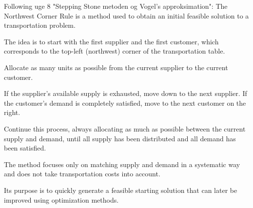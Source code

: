 Following uge 8 "Stepping Stone metoden og Vogel’s approksimation": The Northwest Corner Rule is a method used to obtain an initial feasible solution to a transportation problem.

The idea is to start with the first supplier and the first customer, which corresponds to the top-left (northwest) corner of the transportation table.

Allocate as many units as possible from the current supplier to the current customer.

If the supplier's available supply is exhausted, move down to the next supplier. If the customer's demand is completely satisfied, move to the next customer on the right.

Continue this process, always allocating as much as possible between the current supply and demand, until all supply has been distributed and all demand has been satisfied.

The method focuses only on matching supply and demand in a systematic way and does not take transportation costs into account.

Its purpose is to quickly generate a feasible starting solution that can later be improved using optimization methods.